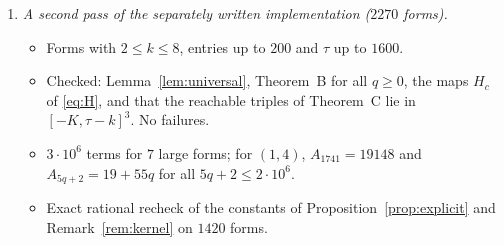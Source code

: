 \documentclass[11pt]{amsart}
\theoremstyle{definition}
\theoremstyle{remark}
\begin{document}
\begin{enumerate}
  \begin{itemize}
  \item $433$ forms, $6000$ terms each: Lemma~\ref{lem:universal}, the bound $U\le\tau-k$, and Theorem~B for all $q\ge0$ with $d(0)=0$. Forms: all $k=2$ with $a_j\le12$; all $k=3$ with $a_j\le5$; $150$ random forms with $k\in\{3,4,5\}$ and $a_j\le12$; extremal forms $(1,\dots,1)$, $(1,\dots,1,20)$, $(20,1,\dots,1)$. No failures.
  \item $17$ forms, $2\cdot10^4$ terms: the explicit constants of Proposition~\ref{prop:explicit} and Remark~\ref{rem:kernel}, verified coordinate by coordinate.
  \item $12$ named forms: the automaton of Theorem~C reproduces $d(0),\dots,d(2\cdot10^4)$ exactly. After minimisation it has $17$, $19$, $37$ and $24$ states for $(1,4)$, $(1,5)$, $(2,7)$ and $(1,1,5)$ respectively. These numbers match the Walnut-certified automata of Section~\ref{sec:walnut}.
  \item $10$ named forms and $736$ further forms (Remark~\ref{rem:boxes}): exact ranges from the reachable states of the automaton of Theorem~C, narrowest boxes, the excess of $(L^*,U^*)$, $V(1)\in[-K,\tau-k]^3$, and minimal sizes in both conventions.
  \end{itemize}
\item \emph{A second pass of the separately written implementation ($2270$ forms).}
  \begin{itemize}
  \item Forms with $2\le k\le8$, entries up to $200$ and $\tau$ up to $1600$.
  \item Checked: Lemma~\ref{lem:universal}, Theorem~B for all $q\ge0$, the maps $H_c$ of \eqref{eq:H}, and that the reachable triples of Theorem~C lie in $[-K,\tau-k]^3$. No failures.
  \item $3\cdot10^6$ terms for $7$ large forms; for $(1,4)$, $A_{1741}=19148$ and $A_{5q+2}=19+55q$ for all $5q+2\le2\cdot10^6$.
  \item Exact rational recheck of the constants of Proposition~\ref{prop:explicit} and Remark~\ref{rem:kernel} on $1420$ forms.
  \end{itemize}
\end{enumerate}
\end{document}
